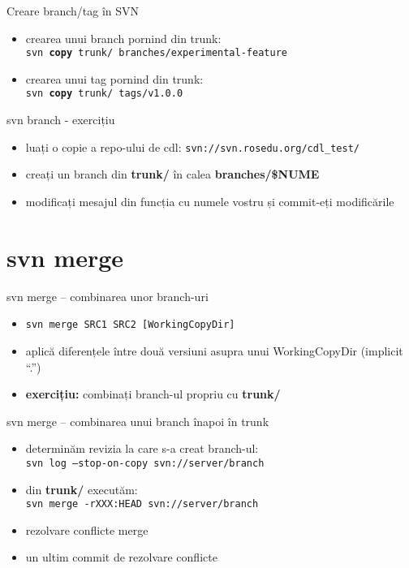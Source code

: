 \documentclass{beamer}
\begin{document}
\begin{frame}{Creare branch/tag în SVN}
  \begin{itemize}[<+->]
  \item crearea unui branch pornind din trunk:\\
    \texttt{svn \textbf{copy} trunk/ branches/experimental-feature}

  \item crearea unui tag pornind din trunk:\\
    \texttt{svn \textbf{copy} trunk/ tags/v1.0.0}
   
  \end{itemize}
\end{frame}

\begin{frame}{svn branch - exercițiu}
  \begin{itemize}[<+->]
  \item luați o copie a repo-ului de cdl: \texttt{svn://svn.rosedu.org/cdl\_test/}
  \item creați un branch din \textbf{trunk/} în calea \textbf{branches/\$NUME}
  \item modificați mesajul din funcția cu numele vostru și commit-eți modificările
  \end{itemize}
\end{frame}





\section{svn merge}
\frame{\tableofcontents[currentsection]}



\begin{frame}{svn merge – combinarea unor branch-uri}
  \begin{itemize}[<+->]
  \item \texttt{svn merge SRC1 SRC2 [WorkingCopyDir]}
  \item aplică diferențele între două versiuni asupra unui WorkingCopyDir (implicit ``.'')
  \item \textbf{exercițiu:} combinați branch-ul propriu cu \textbf{trunk/}
  \end{itemize}
\end{frame}


\begin{frame}{svn merge – combinarea unui branch înapoi în trunk}
  \begin{itemize}[<+->]
    \item determinăm revizia la care s-a creat branch-ul:\\
      \small{\texttt{svn log --stop-on-copy svn://server/branch}}
    \item din \textbf{trunk/} executăm:\\
      \small{\texttt{svn merge -rXXX:HEAD svn://server/branch}}
    \item rezolvare conflicte merge
    \item un ultim commit de rezolvare conflicte
  \end{itemize}
\end{frame}
\end{document}
